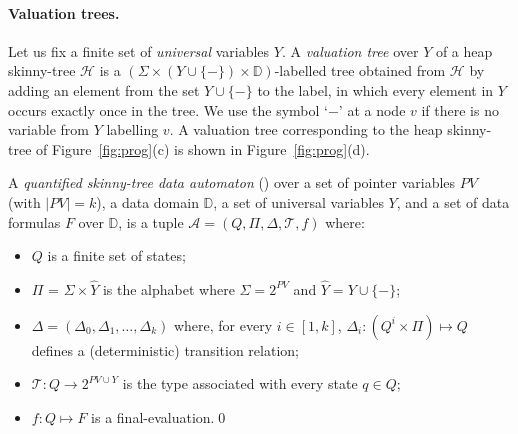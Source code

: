 \documentclass{llncs}
\newcommand{\A}{\mathcal{A}}
\newcommand{\yblank}{-}
\newcommand{\PV}{\mathit{PV}}
\newcommand{\dom}{\mathbb{D}}
\newcommand{\HC}{\mathcal{H}}
\begin{document}
\paragraph{\bf Valuation trees.} Let us fix a finite set of {\em universal} variables $Y$. A {\em valuation tree} over $Y$ of a heap skinny-tree $\HC$ is a $(\Sigma \times (Y \cup
\{\yblank\}) \times \dom)$-labelled tree  obtained from $\HC$ by adding an element from the set $Y \cup\{\yblank\}$ to the label, in which every element in $Y$ occurs exactly once in the tree. We use  the symbol `$\yblank$' at a node $v$ if there is no variable from $Y$ labelling  $v$.
A valuation tree corresponding to the heap skinny-tree of Figure~\ref{fig:prog}(c) is shown in Figure~\ref{fig:prog}(d).








\begin{definition}
A {\em quantified skinny-tree data automaton} (\QSDA) over a set of pointer variables $\PV$ (with $|\PV|=k$), a data domain $\dom$, a set of universal variables $Y$, and a set of data formulas $F$ over $\dom$, is a tuple $\A = (Q, \Pi, \Delta, \mathcal{T}, f)$ where:
\begin{itemize}
\item $Q$ is a finite set of states;
\item $\Pi$ = $\Sigma \times \widehat{Y}$ is the alphabet where $\Sigma = 2^{PV}$ and $\widehat{Y} = Y \cup \{-\}$;
\item $\Delta= (\Delta_0, \Delta_1, \ldots, \Delta_k)$ where, for every $i\in[1,k]$,  $\Delta_i : (Q^i \times \Pi) \mapsto Q$ defines a (deterministic) transition relation; \item $\mathcal{T}: Q \rightarrow 2^{PV \cup Y} $ is the type associated with every state $q \in Q$; \item $f: Q \mapsto F$ is a final-evaluation.\qed \end{itemize}
\end{definition}
\end{document}
